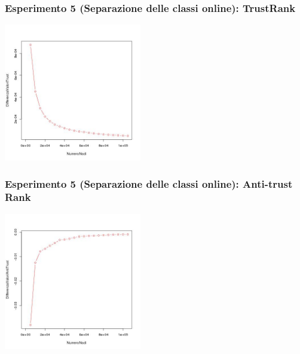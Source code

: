 \documentclass{beamer}
\begin{document}
\begin{frame}
\frametitle{Esperimento 5 {\tiny(Separazione delle classi online)}: TrustRank}
\begin{center}
 \includegraphics[height=6cm]{immagini/test5/averageTest_trust_62}
\end{center}
\end{frame}
\begin{frame}
\frametitle{Esperimento 5 {\tiny(Separazione delle classi online)}: Anti-trust Rank}
\begin{center}
 \includegraphics[height=6cm]{immagini/test5/averageTest_antitrust_62}
\end{center}
\end{frame}
\end{document}
